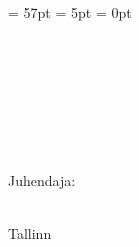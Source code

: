\begin{titlepage}
\headheight = 57pt
\footskip = 5pt
\headsep = 0pt

\centering
\universityEst\\
\schoolEst

\vspace*{4.5 cm}

\begin{center}

\meEst{\authorName}\studentcodeEst{\studentcode}\\
\vspace*{1.5 cm}

\begin{Large}
\textsc{\textbf{\doctitleEst}}\\
\end{Large}

\vspace*{1.5 cm}
\doctypeEst{\doctype}\\
\end{center}

\vspace*{0.6 cm}

\begin{flushright}
Juhendaja: \supervisorEst{\supervisor}\\\supervisortitleEst{\supervisortitle}\\
\vspace*{0.2 cm}
\end{flushright}
\vfill

Tallinn \Year
\end{titlepage}